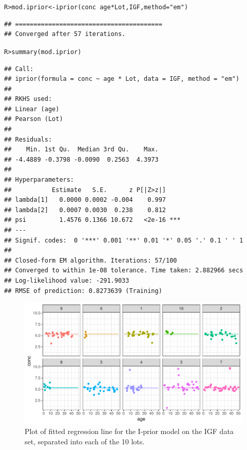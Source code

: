 \documentclass[showframe,11pt,twoside,openright]{report}\usepackage[]{graphicx}\usepackage[]{color}
\makeatletter
\def\maxwidth{ %
  \ifdim\Gin@nat@width>\linewidth
    \linewidth
  \else
    \Gin@nat@width
  \fi
}
\newcommand{\hlstr}[1]{\textcolor[rgb]{0.063,0.58,0.627}{#1}}%
\newcommand{\hlopt}[1]{\textcolor[rgb]{0.196,0.196,0.196}{#1}}%
\newcommand{\hlstd}[1]{\textcolor[rgb]{0.196,0.196,0.196}{#1}}%
\newcommand{\hlkwb}[1]{\textcolor[rgb]{0.627,0,0.314}{#1}}%
\newcommand{\hlkwc}[1]{\textcolor[rgb]{0,0.631,0.314}{#1}}%
\newcommand{\hlkwd}[1]{\textcolor[rgb]{0.78,0.227,0.412}{#1}}%
\newenvironment{kframe}{%
 \def\at@end@of@kframe{}%
 \ifinner\ifhmode%
  \def\at@end@of@kframe{\end{minipage}}%
  \begin{minipage}{\columnwidth}%
 \fi\fi%
 \def\FrameCommand##1{\hskip\@totalleftmargin \hskip-\fboxsep
 \colorbox{shadecolor}{##1}\hskip-\fboxsep
     \hskip-\linewidth \hskip-\@totalleftmargin \hskip\columnwidth}%
 \MakeFramed {\advance\hsize-\width
   \@totalleftmargin\z@ \linewidth\hsize
   \@setminipage}}%
 {\par\unskip\endMakeFramed%
 \at@end@of@kframe}
\newenvironment{knitrout}{}{} %
\makeatother
\begin{document}
\begin{knitrout}
\color{fgcolor}\begin{kframe}
\begin{alltt}
\hlstd{R> }\hlstd{mod.iprior} \hlkwb{<-} \hlkwd{iprior}\hlstd{(conc} \hlopt{~} \hlstd{age} \hlopt{*} \hlstd{Lot, IGF,} \hlkwc{method} \hlstd{=} \hlstr{"em"}\hlstd{)}
\end{alltt}
\begin{verbatim}
## ========================================
## Converged after 57 iterations.
\end{verbatim}
\begin{alltt}
\hlstd{R> }\hlkwd{summary}\hlstd{(mod.iprior)}
\end{alltt}
\begin{verbatim}
## Call:
## iprior(formula = conc ~ age * Lot, data = IGF, method = "em")
## 
## RKHS used:
## Linear (age)
## Pearson (Lot)
## 
## Residuals:
##    Min. 1st Qu.  Median 3rd Qu.    Max. 
## -4.4889 -0.3798 -0.0090  0.2563  4.3973 
## 
## Hyperparameters:
##           Estimate   S.E.      z P[|Z>z|]    
## lambda[1]   0.0000 0.0002 -0.004    0.997    
## lambda[2]   0.0007 0.0030  0.238    0.812    
## psi         1.4576 0.1366 10.672   <2e-16 ***
## ---
## Signif. codes:  0 '***' 0.001 '**' 0.01 '*' 0.05 '.' 0.1 ' ' 1
## 
## Closed-form EM algorithm. Iterations: 57/100 
## Converged to within 1e-08 tolerance. Time taken: 2.882966 secs
## Log-likelihood value: -291.9033 
## RMSE of prediction: 0.8273639 (Training)
\end{verbatim}
\end{kframe}
\end{knitrout}
\begin{knitrout}
\color{fgcolor}\begin{figure}

{\centering \includegraphics[width=\maxwidth]{figure/04-IGF_mod_iprior_plot-1} 

}

\caption[Plot of fitted regression line for the I-prior model on the IGF data set, separated into each of the 10 lots]{Plot of fitted regression line for the I-prior model on the IGF data set, separated into each of the 10 lots.}\label{fig:IGF.mod.iprior.plot}
\end{figure}


\end{knitrout}
\end{document}
